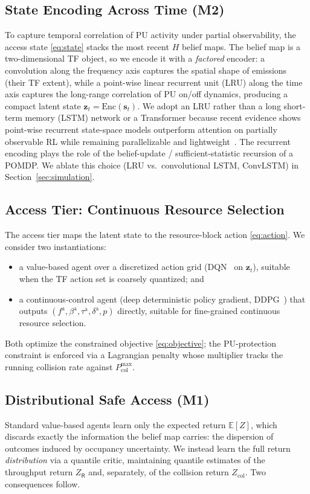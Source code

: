 \documentclass[journal]{IEEEtran}
\newcommand{\E}{\mathbb{E}}
\newcommand{\afc}{f^{\mathrm{a}}}          %
\newcommand{\aBW}{\beta^{\mathrm{a}}}      %
\newcommand{\ats}{\tau^{\mathrm{a}}}       %
\newcommand{\adur}{\delta^{\mathrm{a}}}    %
\newcommand{\pwr}{p}                       %
\newcommand{\state}{\bm{s}}                %
\newcommand{\histlen}{H}                   %
\newcommand{\Pcolmax}{P_{\mathrm{col}}^{\max}} %
\newcommand{\Zret}{Z}                       %
\newcommand{\Zcol}{Z_{\mathrm{col}}}        %
\newcommand{\Zthru}{Z_{\mathsf{R}}}         %
\begin{document}
\subsection{State Encoding Across Time (M2)}
\label{subsec:state_encoding}
To capture temporal correlation of PU activity under partial observability,
the access state \eqref{eq:state} stacks the most recent $\histlen$ belief
maps. The belief map is a two-dimensional TF object, so we encode it with a
\emph{factored} encoder: a convolution along the frequency axis captures the
spatial shape of emissions (their TF extent), while a point-wise linear
recurrent unit (LRU) along the time axis captures the long-range correlation
of PU on/off dynamics, producing a compact latent state
$\bm{z}_t = \mathrm{Enc}(\state_t)$. We adopt an LRU rather than a long
short-term memory (LSTM) network or a Transformer because recent evidence
shows point-wise recurrent state-space
models outperform attention on partially observable RL while remaining
parallelizable and lightweight~\cite{lu2024rethinking,morad2025cae}. The
recurrent encoding plays the role of the belief-update / sufficient-statistic
recursion of a POMDP. We ablate this choice (LRU vs.\ convolutional LSTM,
ConvLSTM) in Section~\ref{sec:simulation}.

\subsection{Access Tier: Continuous Resource Selection}
\label{subsec:access_tier}
The access tier maps the latent state to the resource-block action
\eqref{eq:action}. We consider two instantiations:
\begin{itemize}
\item a value-based agent over a discretized action grid (DQN~\cite{hausknecht2015drqn}
on $\bm{z}_t$), suitable when the TF action set is coarsely quantized; and
\item a continuous-control agent (deep deterministic policy gradient,
DDPG~\cite{lillicrap2016ddpg}) that
outputs $(\afc,\aBW,\ats,\adur,\pwr)$ directly, suitable for fine-grained
continuous resource selection.
\end{itemize}
Both optimize the constrained objective \eqref{eq:objective}; the
PU-protection constraint is enforced via a Lagrangian penalty whose
multiplier tracks the running collision rate against $\Pcolmax$.

\subsection{Distributional Safe Access (M1)}
\label{subsec:dist_rl}
Standard value-based agents learn only the expected return $\E[\Zret]$, which
discards exactly the information the belief map carries: the dispersion of
outcomes induced by occupancy uncertainty. We instead learn the full return
\emph{distribution} via a quantile critic, maintaining quantile estimates of
the throughput return $\Zthru$ and, separately, of the collision return
$\Zcol$. Two consequences follow.
\end{document}
